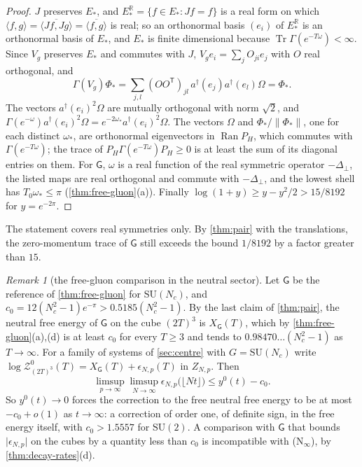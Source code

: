 \documentclass[11pt,a4paper]{amsart}
\theoremstyle{definition}
\theoremstyle{remark}
\newtheorem{remark}[theorem]{Remark}
\numberwithin{equation}{section}
\DeclareMathOperator{\Tr}{Tr}        %
\newcommand{\R}{\mathbb{R}}          %
\newcommand{\ip}[2]{\langle #1,#2\rangle}  %
\newcommand{\norm}[1]{\lVert #1\rVert}     %
\newcommand{\abs}[1]{\lvert #1\rvert}      %
\newcommand{\SU}{\mathrm{SU}}              %
\newcommand{\TT}{\mathbb{T}}               %
\newcommand{\Zc}{\mathcal{Z}}              %
\newcommand{\cube}[1]{(2#1)^3}             %
\newcommand{\Gharm}{\mathsf{G}}            %
\newcommand{\xconst}{\frac{1}{8192}}       %
\newcommand{\xconstinl}{1/8192}            %
\begin{document}
\begin{proof}
$J$ preserves $E_*$, and $E_*^\R=\{f\in E_*:Jf=f\}$ is a real form on which $\ip fg=\overline{\ip{Jf}{Jg}}=\overline{\ip fg}$ is real; so an orthonormal basis $(e_i)$ of $E_*^\R$ is an orthonormal basis of $E_*$, and $E_*$ is finite dimensional because $\Tr\Gamma(e^{-T\omega})<\infty$. Since $V_g$ preserves $E_*$ and commutes with $J$, $V_ge_i=\sum_jO_{ji}e_j$ with $O$ real orthogonal, and
\[
\Gamma(V_g)\Phi_*=\sum_{j,l}(OO^{\mathsf T})_{jl}\,a^\dagger(e_j)a^\dagger(e_l)\Omega=\Phi_*.
\]
The vectors $a^\dagger(e_i)^2\Omega$ are mutually orthogonal with norm $\sqrt2$, and $\Gamma(e^{-\omega})a^\dagger(e_i)^2\Omega=e^{-2\omega_*}a^\dagger(e_i)^2\Omega$. The vectors $\Omega$ and $\Phi_*/\norm{\Phi_*}$, one for each distinct $\omega_*$, are orthonormal eigenvectors in $\operatorname{Ran}P_H$, which commutes with $\Gamma(e^{-T\omega})$; the trace of $P_H\Gamma(e^{-T\omega})P_H\ge0$ is at least the sum of its diagonal entries on them. For $\Gharm$, $\omega$ is a real function of the real symmetric operator $-\Delta_\perp$, the listed maps are real orthogonal and commute with $-\Delta_\perp$, and the lowest shell has $T_0\omega_*\le\pi$ (\cref{thm:free-gluon}(a)). Finally $\log(1+y)\ge y-y^2/2>15/8192$ for $y=e^{-2\pi}$.
\end{proof}

The statement covers real symmetries only. By \cref{thm:pair} with the translations, the zero-momentum trace of $\Gharm$ still exceeds the bound $\xconstinl$ by a factor greater than $15$.

\begin{remark}[the free-gluon comparison in the neutral sector]\label{rem:free-gluon-neutral}
Let $\Gharm$ be the reference of \cref{thm:free-gluon} for $\SU(N_c)$, and $c_0=12(N_c^2-1)e^{-\pi}>0.5185(N_c^2-1)$. By the last claim of \cref{thm:pair}, the neutral free energy of $\Gharm$ on the cube $\cube T$ is $X_\Gharm(T)$, which by \cref{thm:free-gluon}\textup{(a),(d)} is at least $c_0$ for every $T\ge3$ and tends to $0.98470\ldots(N_c^2-1)$ as $T\to\infty$. For a family of systems of \cref{sec:centre} with $G=\SU(N_c)$ write $\log\Zc^0_{\cube T}(T)=X_\Gharm(T)+\epsilon_{N,p}(T)$ in $Z_{N,p}$. Then
\[
\limsup_{p\to\infty}\limsup_{N\to\infty}\epsilon_{N,p}\bigl(\lfloor Nt\rfloor\bigr)\le y^0(t)-c_0 .
\]
So $y^0(t)\to0$ forces the correction to the free neutral free energy to be at most $-c_0+o(1)$ as $t\to\infty$: a correction of order one, of definite sign, in the free energy itself, with $c_0>1.5557$ for $\SU(2)$. A comparison with $\Gharm$ that bounds $\abs{\epsilon_{N,p}}$ on the cubes by a quantity less than $c_0$ is incompatible with \textup{(N$_\infty$)}, by \cref{thm:decay-rates}\textup{(d)}.
\end{remark}
\end{document}
